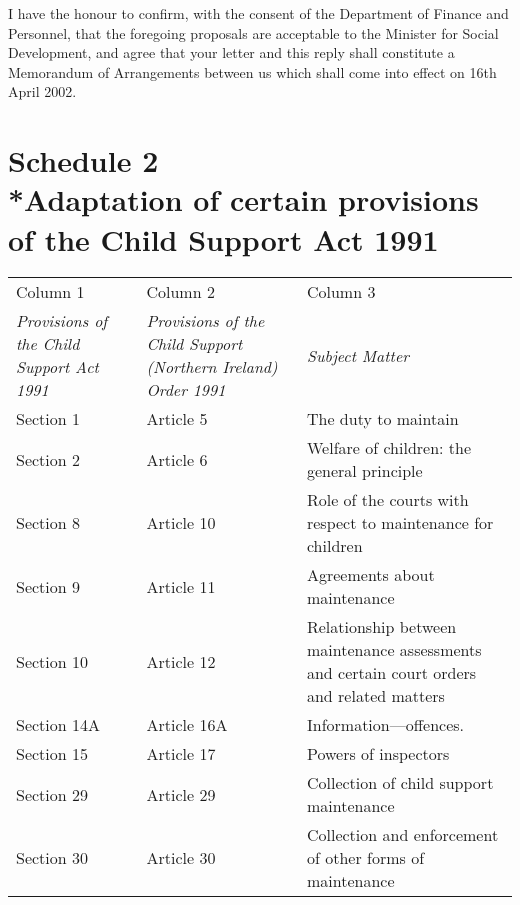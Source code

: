 \documentclass[12pt,a4paper]{article}
\begin{document}
I have the honour to confirm, with the consent of the Department of Finance and Personnel, that the foregoing proposals are acceptable to the Minister for Social Development, and agree that your letter and this reply shall constitute a Memorandum of Arrangements between us which shall come into effect on 16th April 2002.

\part[Schedule 2 --- Adaptation of certain provisions of the Child Support Act 1991]{Schedule 2\\*Adaptation of certain provisions of the Child Support Act 1991}

\renewcommand\parthead{--- Schedule 2}

\noindent
\begin{longtable}{p{71.1145pt}p{108.42673pt}p{174.45883pt}}
\hline
Column 1 & Column 2 & Column 3\\
\itshape Provisions of the Child Support Act 1991 & \itshape Provisions of the Child Support (Northern Ireland) Order 1991 & \itshape Subject Matter\\
\hline
\endhead
\hline
\endlastfoot
Section 1&Article 5&The duty to maintain\\
Section 2&Article 6&Welfare of children: the general principle\\
Section 8&Article 10&Role of the courts with respect to maintenance for children\\
Section 9&Article 11&Agreements about maintenance\\
Section 10&Article 12&Relationship between maintenance assessments and certain court orders and related matters\\
Section 14A &Article 16A &Information—offences. \\ %
Section 15&Article 17&Powers of inspectors\\
Section 29&Article 29&Collection of child support maintenance\\
Section 30&Article 30&Collection and enforcement of other forms of maintenance\\
\end{longtable}
\end{document}
